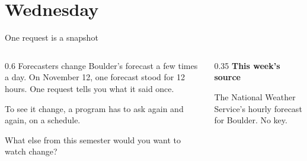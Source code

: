 \documentclass[9pt,aspectratio=169]{beamer}
\begin{document}
\section{Wednesday}


\begin{frame}{One request is a snapshot}
    \begin{columns}[T]
        \begin{column}{0.6\textwidth}
            Forecasters change Boulder's forecast a few times a day. On November 12, one forecast stood for 12 hours. One request tells you what it said once.

            \medskip
            To see it change, a program has to ask again and again, on a schedule.

            \medskip
            What else from this semester would you want to watch change?
        \end{column}
        \begin{column}{0.35\textwidth}
            \textbf{This week's source}\\[2pt]
            {\footnotesize The National Weather Service's hourly forecast for Boulder. No key.\par}
        \end{column}
    \end{columns}
\end{frame}
\end{document}
